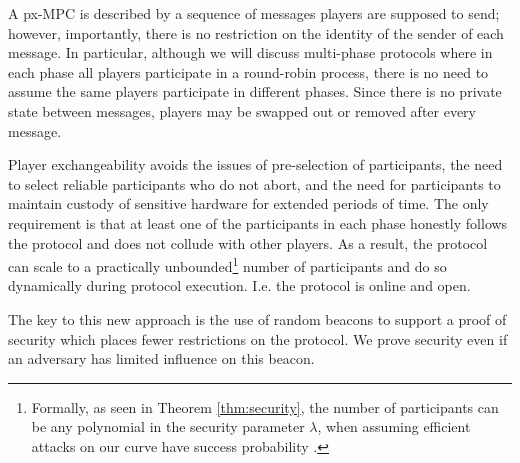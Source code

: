 \documentclass{article}
\begin{document}
A px-MPC is described by a sequence of messages players are supposed to send; however, importantly, there is no restriction on the identity of the sender of each message.
In particular, although we will discuss multi-phase  protocols where in each phase all players participate in a round-robin process, there is no need to assume the same players participate in different phases. %
 Since there is no private state between messages, players may be swapped out or removed after every message.

Player exchangeability  avoids the issues of pre-selection of participants, the need to select reliable participants who do not abort, and the need for participants to maintain custody of sensitive hardware for extended periods of time. The only requirement is that at least one of the participants in each phase honestly follows the protocol and does not collude with other players. As a result, the protocol can scale to a practically unbounded\footnote{Formally, as seen in Theorem \ref{thm:security}, the number of participants can be any polynomial in the security parameter $\lambda$, when assuming efficient attacks on our curve have success probability \negl.} number of participants and do so dynamically during protocol execution. I.e. the protocol is online and open.

The key to this new approach is the use of random beacons to support a proof of security which places fewer restrictions on the protocol. We prove security even if an adversary has limited influence on this beacon. 
\end{document}
